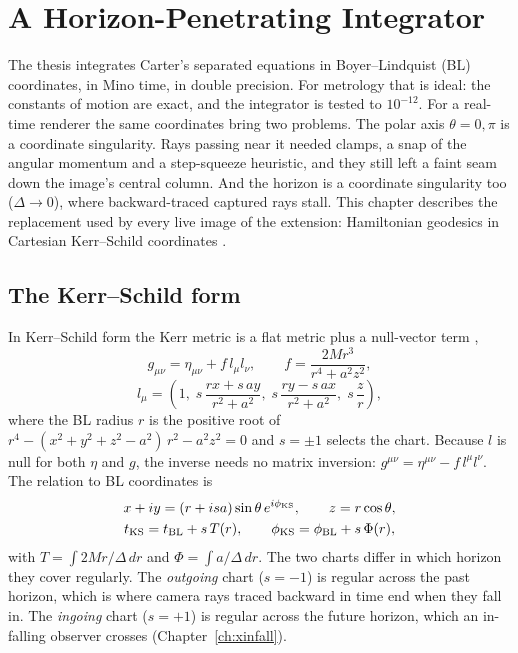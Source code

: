 \chapter{A Horizon-Penetrating Integrator}
\label{ch:xks}

The thesis integrates Carter's separated equations in Boyer--Lindquist (BL)
coordinates, in Mino time, in double precision. For metrology that is ideal:
the constants of motion are exact, and the integrator is tested to
$10^{-12}$. For a real-time renderer the same coordinates bring two problems.
The polar axis $\theta = 0, \pi$ is a coordinate singularity. Rays passing
near it needed clamps, a snap of the angular momentum and a step-squeeze
heuristic, and they still left a faint seam down the image's central column.
And the horizon is a coordinate singularity too ($\Delta \to 0$), where
backward-traced captured rays stall. This chapter describes the replacement
used by every live image of the extension: Hamiltonian geodesics in
Cartesian Kerr--Schild coordinates \citep{KerrSchild2009, Visser2007}.

\section{The Kerr--Schild form}

In Kerr--Schild form the Kerr metric is a flat metric plus a null-vector
term \citep{Kerr1963, KerrSchild2009},
\begin{equation}
g_{\mu\nu} = \eta_{\mu\nu} + f\,l_\mu l_\nu, \qquad
f = \frac{2Mr^3}{r^4 + a^2z^2},
\label{eq:ksmetric}
\end{equation}
\begin{equation}
l_\mu = \left(1,\; s\,\frac{rx + s\,ay}{r^2 + a^2},\;
s\,\frac{ry - s\,ax}{r^2 + a^2},\; s\,\frac{z}{r}\right),
\end{equation}
where the BL radius $r$ is the positive root of
$r^4 - (x^2 + y^2 + z^2 - a^2)\,r^2 - a^2z^2 = 0$ and $s = \pm1$ selects the
chart. Because $l$ is null for both $\eta$ and $g$, the inverse needs no
matrix inversion: $g^{\mu\nu} = \eta^{\mu\nu} - f\,l^\mu l^\nu$. The relation
to BL coordinates is
\begin{equation}
\begin{gathered}
x + iy = (r + i s a)\sin\theta\,e^{i\phi_{\rm KS}}, \qquad z = r\cos\theta, \\
t_{\rm KS} = t_{\rm BL} + s\,T(r), \qquad \phi_{\rm KS} = \phi_{\rm BL} + s\,\Phi(r),
\end{gathered}
\end{equation}
with $T = \int 2Mr/\Delta\,dr$ and $\Phi = \int a/\Delta\,dr$. The two charts
differ in which horizon they cover regularly. The \emph{outgoing} chart
($s = -1$) is regular across the past horizon, which is where camera rays
traced backward in time end when they fall in. The \emph{ingoing} chart
($s = +1$) is regular across the future horizon, which an in-falling observer
crosses (Chapter~\ref{ch:xinfall}).

